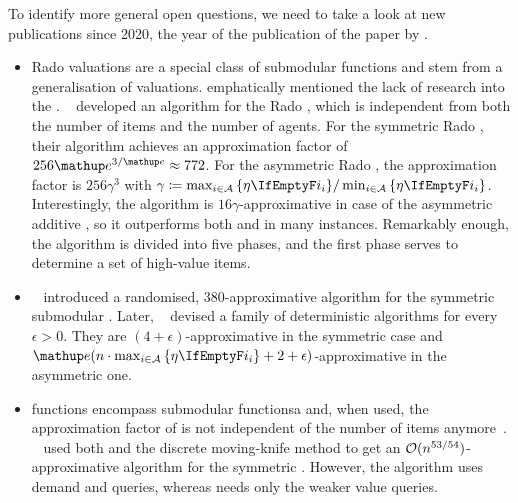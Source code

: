 To identify more general open questions, we need to take a look at new publications since 2020, the year of the publication of the paper by \citeauthor{APNSWuSVþUM}.
\begin{itemize}
	\item
	Rado valuations are a special class of submodular functions and stem from a generalisation of \OXS{} valuations.
	 emphatically mentioned the lack of research into the \OXS{} \NSW.
	~\cite{approximating_nsw_under_rado_valuations} developed an algorithm for the Rado \NSW, which is independent from both the number of items and the number of agents.
	For the symmetric Rado \NSW, their algorithm achieves an approximation factor of \(256 \euler^{3/\euler} \approx 772\).
	For the asymmetric Rado \NSW, the approximation factor is \(256 \gamma^3\) with \(\gamma \coloneq \max_{i \in \agents} \,\braces{\weight} / \min_{i \in \agents} \,\braces{\weight}\).
	Interestingly, the algorithm is \(16 \gamma\)-approximative in case of the asymmetric additive \NSW, so it outperforms both \SMatch{} and \RepReMatch{} in many instances.
	Remarkably enough, the algorithm is divided into five phases, and the first phase serves to determine a set of high-value items.

	\item
	\citeauthor{a_constfactor_approx_algo_for_nsw_with_submod_valuations}~\cite{a_constfactor_approx_algo_for_nsw_with_submod_valuations} introduced a randomised, \(380\)-approximative algorithm for the symmetric submodular \NSW.
	Later, \citeauthor{approx_nsw_by_matching_and_local_search}~\cite{approx_nsw_by_matching_and_local_search} devised a family of deterministic algorithms for every \(\epsilon > 0\).
	They are \((4+\epsilon)\)-approximative in the symmetric case and \(\euler(n \cdot \max_{i \in \agents} \,\braces{\weight} + 2 + \epsilon)\)-approximative in the asymmetric one.

	\item
	\XOS{} functions encompass submodular functionsa and, when used, the approximation factor of \RepReMatch{} is not independent of the number of items anymore~\cite[Section 6.2]{APNSWuSVþUM}.
	~\cite{sublin_approx_algo_for_nsw_with_xos_valuations} used both \RepReMatch{} and the discrete moving-knife method to get an \(\mathcal{O}(n^{53/54})\)-approximative algorithm for the symmetric \XOS{} \NSW.
	However, the algorithm uses demand and \XOS{} queries, whereas \RepReMatch{} needs only the weaker value queries.


\end{itemize}
